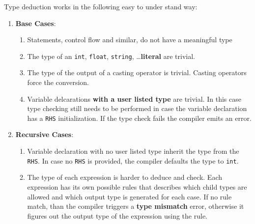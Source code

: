 \documentclass[a4paper]{article}
\begin{document}
Type deduction works in the following easy to under stand way:
\begin{enumerate}
\item \textbf{Base Cases}:
  \begin{enumerate}
  \item Statements, control flow and similar, do not have a meaningful type
  \item The type of an \texttt{int}, \texttt{float}, \texttt{string}, \dots  \textbf{literal} are trivial.
  \item The type of the output of a casting operator is trivial. Casting operators force the conversion.
  \item Variable delcarations \textbf{with a user listed type} are trivial. In this case type checking still needs
    to be performed in case the variable declaration has a \texttt{RHS} initialization. If the type check
    fails the compiler emits an error.
  \end{enumerate}
  \item \textbf{Recursive Cases}:
    \begin{enumerate}
    \item Variable declaration with no user listed type inherit the type from the \texttt{RHS}. In case
      no \texttt{RHS} is provided, the compiler defaults the type to \texttt{int}.
    \item The type of each expression is harder to deduce and check. Each expression has its own possible
      rules that describes which child types are allowed and which output type is generated for each case. If
      no rule match, than the compiler triggers a \textbf{type mismatch} error, otherwise it figures out
      the output type of the expression using the rule.
    \end{enumerate}
\end{enumerate}
\end{document}
